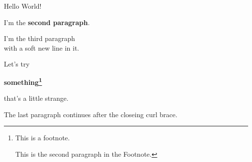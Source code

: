 \documentclass[a4paper,12pt,english]{article}
\begin{document}
Hello World!

I’m the {\bf second paragraph}.

I’m the third paragraph\\
with a soft new line in it.

Let’s try {\bf something\footnote{This is a footnote.

  This is the second paragraph in the Footnote. }

that’s a \Large little strange.} The last paragraph continues after the closeing curl brace.
\end{document}
